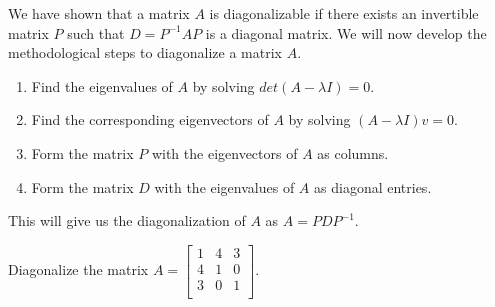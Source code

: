 We have shown that a matrix $A$ is diagonalizable if there exists an invertible matrix $P$ such that $D = P^{-1}AP$ is a diagonal matrix.
We will now develop the methodological steps to diagonalize a matrix $A$.
\begin{enumerate}
\item Find the eigenvalues of $A$ by solving $det(A-\lambda I) = 0$.
\item Find the corresponding eigenvectors of $A$ by solving $(A-\lambda I)v = 0$.
\item Form the matrix $P$ with the eigenvectors of $A$ as columns.
\item Form the matrix $D$ with the eigenvalues of $A$ as diagonal entries.    
\end{enumerate}
This will give us the diagonalization of $A$ as $A = PDP^{-1}$.
\begin{example}{Diagonalize the matrix $A = \begin{bmatrix} 1 & 4 & 3 \\ 4 & 1 & 0 \\ 3 & 0 & 1 \\ \end{bmatrix}$.} \end{example}
